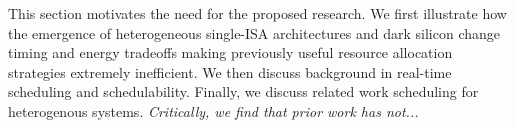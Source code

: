 This section motivates the need for the proposed research.  We first
illustrate how the emergence of heterogeneous single-ISA architectures
and dark silicon change timing and energy tradeoffs making previously
useful resource allocation strategies extremely inefficient.  We then
discuss background in real-time scheduling and schedulability.
Finally, we discuss related work scheduling for heterogenous systems.
\emph{Critically, we find that prior work has not...}
